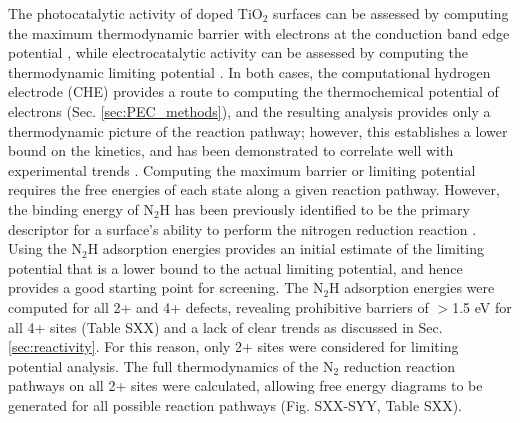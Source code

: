 The photocatalytic activity of doped TiO$_2$ surfaces can be assessed by computing the maximum thermodynamic barrier with electrons at the conduction band edge potential \cite{Comer_2018}, while electrocatalytic activity can be assessed by computing the thermodynamic limiting potential \cite{Norskov_2004,Garc_a_Mota_2011}. In both cases, the computational hydrogen electrode (CHE) provides a route to computing the thermochemical potential of electrons (Sec. \ref{sec:PEC_methods}), and the resulting analysis provides only a thermodynamic picture of the reaction pathway; however, this establishes a lower bound on the kinetics, and has been demonstrated to correlate well with experimental trends \cite{Seh_2017}. Computing the maximum barrier or limiting potential requires the free energies of each state along a given reaction pathway. However, the binding energy of N$_2$H has been previously identified to be the primary descriptor for a surface's ability to perform the nitrogen reduction reaction \cite{Hoskuldsson_2017, Montoya_2015}. Using the N$_2$H adsorption energies provides an initial estimate of the limiting potential that is a lower bound to the actual limiting potential, and hence provides a good starting point for screening. The N$_2$H adsorption energies were computed for all 2+ and 4+ defects, revealing prohibitive barriers of $>$1.5 eV for all 4+ sites (Table SXX) and a lack of clear trends as discussed in Sec. \ref{sec:reactivity}. For this reason, only 2+ sites were considered for limiting potential analysis. %
The full thermodynamics of the N$_2$ reduction reaction pathways on all 2+ sites were calculated, allowing free energy diagrams to be generated for all possible reaction pathways (Fig. SXX-SYY, Table SXX). 



